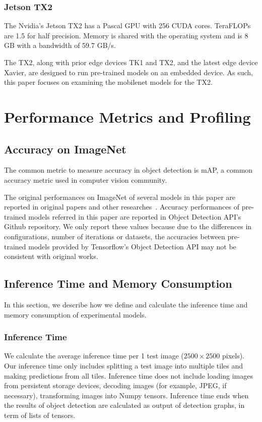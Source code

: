 \documentclass[conference]{IEEEtran}
\begin{document}
\subsubsection{Jetson TX2}

The Nvidia's Jetson TX2 has a Pascal GPU with 256 CUDA cores. TeraFLOPs are 1.5 for half precision. Memory is shared with the operating system and is 8 GB with a bandwidth of 59.7 GB/s.

The TX2, along with prior edge devices TK1 and TX2, and the latest edge device Xavier, are designed to run pre-trained models on an embedded device. As such, this paper focuses on examining the mobilenet models for the TX2.

\section{Performance Metrics and Profiling}

\subsection{Accuracy on ImageNet}
The common metric to measure accuracy in object detection is mAP, a common accuracy metric used in computer vision community.

The original performances on ImageNet of several models in this paper are reported in original papers and other researches~\cite{huang2017speed}. Accuracy performances of pre-trained models referred in this paper are reported in Object Detection API's Github repository. We only report these values because due to the differences in configurations, number of iterations or datasets, the accuracies between pre-trained models provided by Tensorflow's Object Detection API may not be consistent with original works.

\subsection{Inference Time and Memory Consumption}
In this section, we describe how we define and calculate the inference time and memory consumption of experimental models.

\subsubsection{Inference Time}
We calculate the average inference time per 1 test image ($2500 \times 2500$ pixels). Our inference time only includes splitting a test image into multiple tiles and making predictions from all tiles. Inference time does not include loading images from persistent storage devices, decoding images (for example, JPEG, if necessary), transforming images into Numpy tensors. Inference time ends when the results of object detection are calculated as output of detection graphs, in term of lists of tensors.
\end{document}
